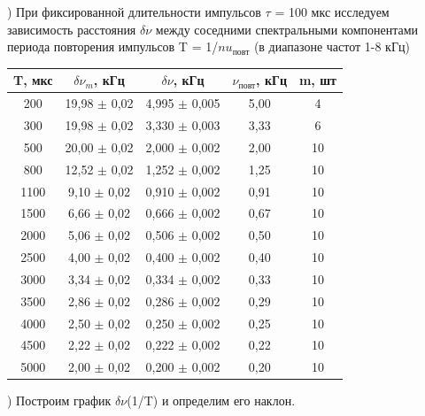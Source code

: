 \documentclass[a4paper,12pt]{article}
\begin{document}
) При фиксированной длительности импульсов $\tau$ = 100 мкс исследуем зависимость расстояния $\delta\nu$ между соседними спектральными компонентами периода повторения импульсов T = 1/$nu_{\text{повт}}$ (в диапазоне частот 1-8 кГц)

\begin{center}
\begin{tabular}{|c|c|c|c|c|}
	\hline
	T, мкс & $\delta\nu_m$, кГц & $\delta\nu$, кГц & $\nu_{\text{повт}}$, кГц & m, шт \\
	\hline
	200 & 19,98 $\pm$ 0,02 & 4,995 $\pm$ 0,005 & 5,00 & 4 \\
	\hline
	300 & 19,98 $\pm$ 0,02 & 3,330 $\pm$ 0,003  & 3,33 & 6 \\
	\hline
	500 & 20,00 $\pm$ 0,02 & 2,000 $\pm$ 0,002 & 2,00 & 10 \\
	\hline
	800 & 12,52 $\pm$ 0,02 & 1,252 $\pm$ 0,002  & 1,25 & 10 \\
	\hline
	1100 & 9,10 $\pm$ 0,02 & 0,910 $\pm$ 0,002  & 0,91 & 10 \\
	\hline
	1500 & 6,66 $\pm$ 0,02  & 0,666 $\pm$ 0,002   & 0,67 & 10 \\
	\hline
	2000 & 5,06 $\pm$ 0,02  & 0,506 $\pm$ 0,002  & 0,50 & 10 \\
	\hline
	2500 & 4,00 $\pm$ 0,02  & 0,400 $\pm$ 0,002   & 0,40 & 10 \\
	\hline
	3000 & 3,34 $\pm$ 0,02  & 0,334 $\pm$ 0,002  & 0,33 & 10 \\
	\hline
	3500 & 2,86 $\pm$ 0,02  & 0,286 $\pm$ 0,002  & 0,29 & 10 \\
	\hline
	4000 & 2,50 $\pm$ 0,02  & 0,250 $\pm$ 0,002  & 0,25 & 10 \\
	\hline
	4500 & 2,22 $\pm$ 0,02  & 0,222 $\pm$ 0,002  & 0,22 & 10 \\
	\hline
	5000 & 2,00 $\pm$ 0,02  & 0,200 $\pm$ 0,002  & 0,20 & 10 \\
	\hline
\end{tabular}
\end{center}

) Построим график $\delta\nu$(1/T) и определим его наклон.
\end{document}
